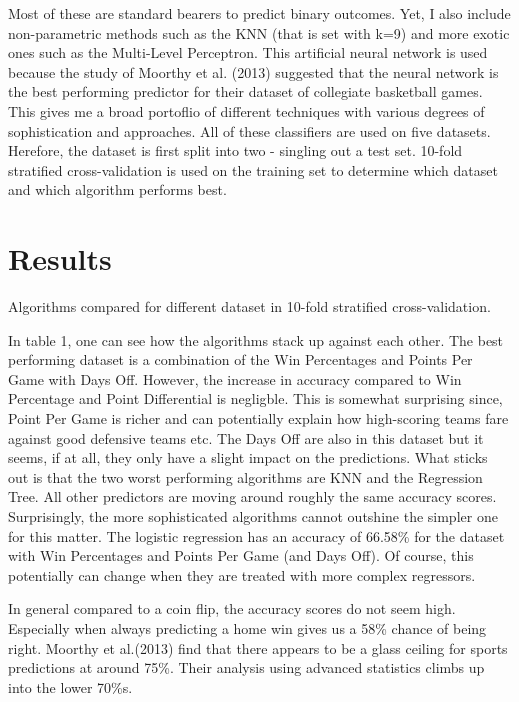 \documentclass[11pt,a4paper,leqno]{article}
\begin{document}
Most of these are standard bearers to predict binary outcomes. Yet, I also include non-parametric methods such as the KNN (that is set with k=9) and more exotic ones such as the Multi-Level Perceptron. This artificial neural network is used because the study of Moorthy et al. (2013) suggested that the neural network is the best performing predictor for their dataset of collegiate basketball games. This gives me a broad portoflio of different techniques with various degrees of sophistication and approaches. All of these classifiers are used on five datasets. Herefore, the dataset is first split into two - singling out a test set. 10-fold stratified cross-validation is used on the training set to determine which dataset and which algorithm performs best.

\section{Results}

\begin{table}

\caption{Algorithms compared for different dataset in 10-fold stratified cross-validation.}
\label{table 1}
    

 \end{table}

In table 1, one can see how the algorithms stack up against each other. The best performing dataset is a combination of the Win Percentages and Points Per Game with Days Off. However, the increase in accuracy compared to Win Percentage and Point Differential is negligble. This is somewhat surprising since, Point Per Game is richer and can potentially explain how high-scoring teams fare against good defensive teams etc. The Days Off are also in this dataset but it seems, if at all, they only have a slight impact on the predictions. What sticks out is that the two worst performing algorithms are KNN and the Regression Tree. All other predictors are moving around roughly the same accuracy scores. Surprisingly, the more sophisticated algorithms cannot outshine the simpler one for this matter. The logistic regression has an accuracy of 66.58\% for the dataset with Win Percentages and Points Per Game (and Days Off). Of course, this potentially can change when they are treated with more complex regressors.

In general compared to a coin flip, the accuracy scores do not seem high. Especially when always predicting a home win gives us a 58\% chance of being right. Moorthy et al.(2013) find that there appears to be a glass ceiling for sports predictions at around 75\%. Their analysis using advanced statistics climbs up into the lower 70\%s.
\end{document}
